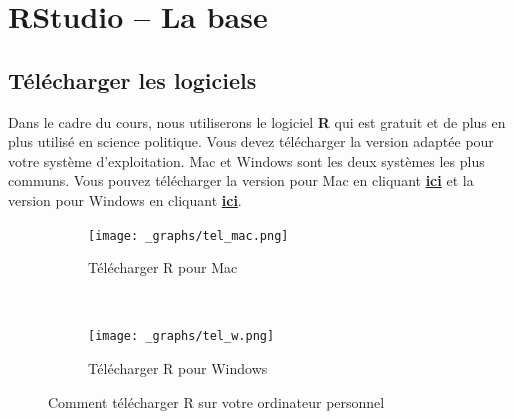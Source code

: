 \documentclass[10.5pt,a4paper]{article}
\begin{document}
\section{RStudio -- La base}
  \subsection{Télécharger les logiciels}
  
Dans le cadre du cours, nous utiliserons le logiciel \textbf{R} qui est gratuit et de plus en plus utilisé en science politique. Vous devez télécharger la version adaptée pour votre système d'exploitation. Mac et Windows sont les deux systèmes les plus communs. Vous pouvez télécharger la version pour Mac en cliquant \href{https://cran.r-project.org/bin/macosx/}{\textbf{ici}} et la version pour Windows en cliquant \href{https://cran.r-project.org/bin/windows/base/}{\textbf{ici}}.
  
\begin{figure}[H]
\centering
\begin{subfigure}{1\textwidth}
  \centering
 \texttt{[image: \_graphs/tel\_mac.png]}
  \caption{Télécharger R pour Mac}
  \label{login}
\end{subfigure}%
\\
\begin{subfigure}{1\textwidth}
  \centering
    \texttt{[image: \_graphs/tel\_w.png]}
  \caption{Télécharger R pour Windows}
  \label{workspace}
\end{subfigure}
\caption{Comment télécharger R sur votre ordinateur personnel}
\label{connexion}
\end{figure}
  
\end{document}
